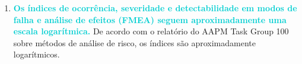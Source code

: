 \documentclass[11pt,a4paper]{article}
\begin{document}
\begin{enumerate}
        \item \textcolor{DarkTurquoise}{\textbf{Os índices de ocorrência, severidade e detectabilidade em modos de falha e análise de efeitos (FMEA) seguem aproximadamente uma escala logarítmica.}} De acordo com o relatório do AAPM Task Group 100 sobre métodos de análise de risco, os índices são aproximadamente logarítmicos.
    
    \end{enumerate}
\end{document}
